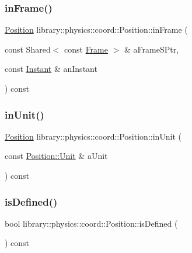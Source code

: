 \subsubsection{\texorpdfstring{in\+Frame()}{inFrame()}}
{\footnotesize\ttfamily \hyperlink{classlibrary_1_1physics_1_1coord_1_1_position}{Position} library\+::physics\+::coord\+::\+Position\+::in\+Frame (\begin{DoxyParamCaption}\item[{const Shared$<$ const \hyperlink{classlibrary_1_1physics_1_1coord_1_1_frame}{Frame} $>$ \&}]{a\+Frame\+S\+Ptr,  }\item[{const \hyperlink{classlibrary_1_1physics_1_1time_1_1_instant}{Instant} \&}]{an\+Instant }\end{DoxyParamCaption}) const}

\mbox{\label{classlibrary_1_1physics_1_1coord_1_1_position_a908878d741ad2de6a2d278d2d674e949}} 
\subsubsection{\texorpdfstring{in\+Unit()}{inUnit()}}
{\footnotesize\ttfamily \hyperlink{classlibrary_1_1physics_1_1coord_1_1_position}{Position} library\+::physics\+::coord\+::\+Position\+::in\+Unit (\begin{DoxyParamCaption}\item[{const \hyperlink{classlibrary_1_1physics_1_1units_1_1_length_a3b8b39cd245cf6b19dc34459baeccb18}{Position\+::\+Unit} \&}]{a\+Unit }\end{DoxyParamCaption}) const}

\mbox{\label{classlibrary_1_1physics_1_1coord_1_1_position_ac13492ffe13b093bb26173089db1a24b}} 
\subsubsection{\texorpdfstring{is\+Defined()}{isDefined()}}
{\footnotesize\ttfamily bool library\+::physics\+::coord\+::\+Position\+::is\+Defined (\begin{DoxyParamCaption}{ }\end{DoxyParamCaption}) const}

